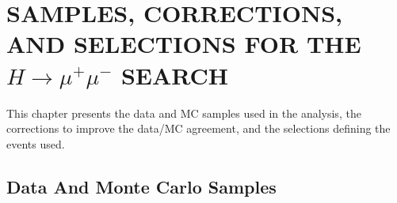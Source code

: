 \chapter{SAMPLES, CORRECTIONS, AND SELECTIONS FOR THE $H\rightarrow\mu^+\mu^-$ SEARCH} \label{samples}

This chapter presents the data and MC samples used in the analysis, the corrections to improve the data/MC agreement, and the selections defining the events used.

\section{Data And Monte Carlo Samples} \label{sampsec}
